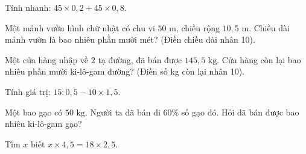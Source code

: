 \begin{ex}
  Tính nhanh: $45 \times 0{,}2 + 45 \times 0{,}8$.
\end{ex}

\begin{ex}
  Một mảnh vườn hình chữ nhật có chu vi $50\text{ m}$, chiều rộng $10{,}5\text{ m}$. Chiều dài mảnh vườn là bao nhiêu phần mười mét? (Điền chiều dài nhân 10).
\end{ex}

\begin{ex}
  Một cửa hàng nhập về $2$ tạ đường, đã bán được $145{,}5\text{ kg}$. Cửa hàng còn lại bao nhiêu phần mười ki-lô-gam đường? (Điền số kg còn lại nhân 10).
\end{ex}

\begin{ex}
  Tính giá trị: $15 : 0{,}5 - 10 \times 1{,}5$.
\end{ex}

\begin{ex}
  Một bao gạo có $50\text{ kg}$. Người ta đã bán đi $60\%$ số gạo đó. Hỏi đã bán được bao nhiêu ki-lô-gam gạo?
\end{ex}

\begin{ex}
  Tìm $x$ biết $x \times 4{,}5 = 18 \times 2{,}5$.
\end{ex}
